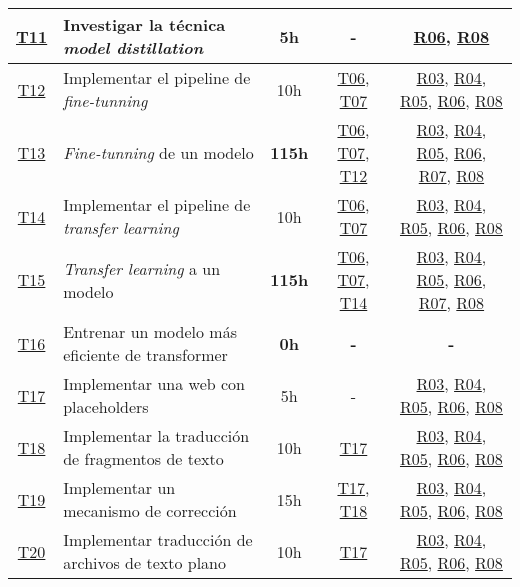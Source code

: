 \begin{landscape}
\begin{table}
\begin{tabular}{ | c | l | c | c | c | }
        \hline
        \hyperref[T11]{T11} & Investigar la técnica \textit{model distillation} & 5h & - & \hyperref[R06]{R06}, \hyperref[R08]{R08} \\
        \hline
        \hyperref[T12]{T12} & Implementar el pipeline de \textit{fine-tunning} & 10h & \hyperref[T06]{T06}, \hyperref[T07]{T07} & \hyperref[R03]{R03}, \hyperref[R04]{R04}, \hyperref[R05]{R05}, \hyperref[R06]{R06}, \hyperref[R08]{R08} \\
        \hline
        \hyperref[T13]{T13} & \textit{Fine-tunning} de un modelo & \textbf{115h} & \hyperref[T06]{T06}, \hyperref[T07]{T07}, \hyperref[T12]{T12} & \hyperref[R03]{R03}, \hyperref[R04]{R04}, \hyperref[R05]{R05}, \hyperref[R06]{R06}, \hyperref[R07]{R07}, \hyperref[R08]{R08} \\
        \hline
        \hyperref[T14]{T14} & Implementar el pipeline de \textit{transfer learning} & 10h & \hyperref[T06]{T06}, \hyperref[T07]{T07} & \hyperref[R03]{R03}, \hyperref[R04]{R04}, \hyperref[R05]{R05}, \hyperref[R06]{R06}, \hyperref[R08]{R08} \\
        \hline
        \hyperref[T15]{T15} & \textit{Transfer learning} a un modelo & \textbf{115h} & \hyperref[T06]{T06}, \hyperref[T07]{T07}, \hyperref[T14]{T14} & \hyperref[R03]{R03}, \hyperref[R04]{R04}, \hyperref[R05]{R05}, \hyperref[R06]{R06}, \hyperref[R07]{R07}, \hyperref[R08]{R08} \\
        \hline
        \hyperref[T16]{T16} & Entrenar un modelo más eficiente de transformer & \textbf{0h} & \textbf{-} & \textbf{-} \\
        \hline
        \hyperref[T17]{T17} & Implementar una web con placeholders & 5h & - & \hyperref[R03]{R03}, \hyperref[R04]{R04}, \hyperref[R05]{R05}, \hyperref[R06]{R06}, \hyperref[R08]{R08} \\
        \hline
        \hyperref[T18]{T18} & Implementar la traducción de fragmentos de texto & 10h & \hyperref[T17]{T17} & \hyperref[R03]{R03}, \hyperref[R04]{R04}, \hyperref[R05]{R05}, \hyperref[R06]{R06}, \hyperref[R08]{R08} \\
        \hline
        \hyperref[T19]{T19} & Implementar un mecanismo de corrección & 15h & \hyperref[T17]{T17}, \hyperref[T18]{T18} & \hyperref[R03]{R03}, \hyperref[R04]{R04}, \hyperref[R05]{R05}, \hyperref[R06]{R06}, \hyperref[R08]{R08} \\
        \hline
        \hyperref[T20]{T20} & Implementar traducción de archivos de texto plano & 10h & \hyperref[T17]{T17} & \hyperref[R03]{R03}, \hyperref[R04]{R04}, \hyperref[R05]{R05}, \hyperref[R06]{R06}, \hyperref[R08]{R08} \\

\end{tabular}
\end{table}
\end{landscape}
